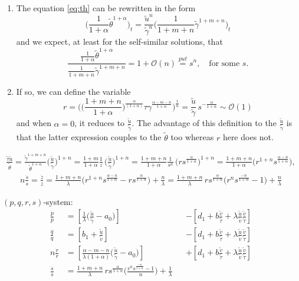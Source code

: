 \documentclass[a4paper,11pt]{article}
\def\tg{{\tilde{\gamma}}}
\def\tv{{\tilde{v}}}
\def\tth{{\tilde{\theta}}}
\def\ts{{\tilde{\tau}}}
\def\tu{{\tilde{u}}}
\def\dpp{\dot{p}}
\def\dqq{\dot{q}}
\def\drr{\dot{r}}
\begin{document}
\begin{enumerate}
 \item The equation \eqref{eq:th} can be rewritten in the form
 $$ \Big(\frac{1}{1+\alpha} \tth^{1+\alpha}\Big)_t = \frac{\tu^n}{\tg^n} \Big(\frac{1}{1+m+n} \tg^{1+m+n}\Big)_t$$
 and we expect, at least for the self-similar solutions, that
 $$ \frac{ \frac{1}{1+\alpha} \tth^{1+\alpha} }{ \frac{1}{1+m+n} \tg^{1+m+n} }  = 1 + \mathcal{O}(n) \overset{put}{=} s^n, \quad \text{for some $s$}. $$
 \item If so, we can define the variable 
 $$r = \Big(\Big(\frac{1+m+n}{1+\alpha}\Big)^{\frac{\alpha}{(1+\alpha)}}\tau \gamma^{\frac{\alpha-m-n}{1+\alpha}}\Big)^{\frac{1}{n}} = \frac{\tu}{\tg}\,s^{-\frac{\alpha}{1+\alpha}} \sim \mathcal{O}(1) $$
 and when $\alpha=0$, it reduces to $\frac{\tu}{\tg}$. The advantage of this definition to the $\frac{\tu}{\tg}$ is that the latter expression couples to the $\tth$ too whereas $r$ here does not. 
\end{enumerate}

\begin{align*}
 \frac{\ts\tu}{\tth} = \frac{\tg^{1+m+n}}{\tth^{1+\alpha}}\Big(\frac{\tu}{\tg}\Big)^{1+n} = \frac{1+m}{1+\alpha} \frac{1}{z}\,\Big(\frac{\tu}{\tg}\Big)^{1+n} =  \frac{1+m+n}{1+\alpha} \frac{1}{s^n}\,\Big(rs^{\frac{\alpha}{1+\alpha}}\Big)^{1+n}
 =\frac{1+m+n}{1+\alpha}\Big( r^{1+n} s^{\frac{\alpha-n}{1+\alpha}}\Big),
\end{align*}
\begin{align*}
n\frac{\dot{s}}{s} = \frac{\dot{z}}{z} = \frac{1+m+n}{\lambda}\Big(r^{1+n}s^{\frac{\alpha-n}{1+\alpha}} - rs^{\frac{\alpha}{1+\alpha}} \Big) + \frac{n}{\lambda} = \frac{1+m+n}{\lambda}\,rs^{\frac{\alpha}{1+\alpha}}\Big(r^{n}s^{\frac{-n}{1+\alpha}} - 1 \Big) + \frac{n}{\lambda}
\end{align*}

$(p,q,r,s)$-system:
\begin{align*}
 \frac{\dpp}{p}&=\left[\frac{1}{\lambda }\Big(\frac{\tu}{\tg}-a_0\Big)\right] & &-\left[d_1 + b\frac{\tv}{\ts} + \lambda\frac{\tu}{\tv}\frac{\tv}{\ts}\right]\\
 \frac{\dqq}{q}&=\left[b_1 +\frac{\tu}{\tv}\right] & &-\left[d_1 + b\frac{\tv}{\ts} + \lambda\frac{\tu}{\tv}\frac{\tv}{\ts}\right]\\
 n\frac{\drr}{r}&=\left[\frac{\alpha-m-n}{\lambda(1+\alpha) }\Big(\frac{\tu}{\tg}-a_0\Big)\right]& &+\left[d_1 + b\frac{\tv}{\ts} + \lambda\frac{\tu}{\tv}\frac{\tv}{\ts}\right]\\
 \frac{\dot{s}}{s} &= \frac{1+m+n}{\lambda}\,rs^{\frac{\alpha}{1+\alpha}}\Big(\frac{r^{n}s^{\frac{-n}{1+\alpha}} - 1}{n} \Big) + \frac{1}{\lambda}
\end{align*}
\end{document}

